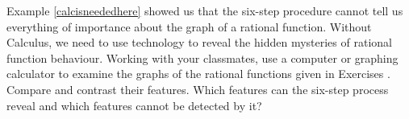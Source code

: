 {\noindent Example \ref{calcisneededhere} showed us that the six-step procedure cannot tell us everything of importance about the graph of a rational function.  Without Calculus, we need to use technology to reveal the hidden mysteries of rational function behaviour.  Working with your classmates, use a computer or graphing calculator to examine the graphs of the rational functions given in Exercises}
{.  Compare and contrast their features.  Which features can the six-step process reveal and which features cannot be detected by it?}
